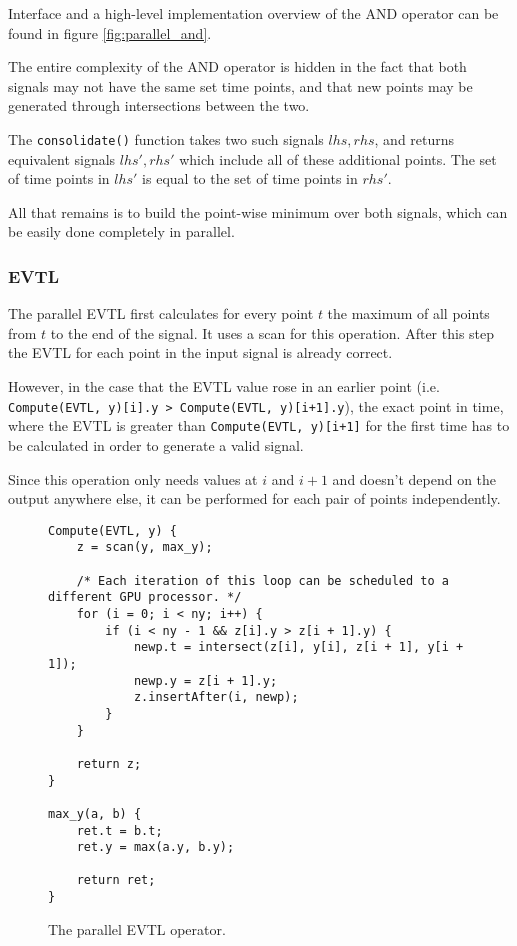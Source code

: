 \documentclass[a4paper,10pt]{article}
\begin{document}
Interface and a high-level implementation overview of the AND operator can be found 
in figure \ref{fig:parallel_and}.

The entire complexity of the AND operator is hidden in the fact that
both signals may not have the same set time points, and that new points
may be generated through intersections between the two.

The \lstinline|consolidate()|
function takes two such signals $lhs, rhs$, and returns equivalent signals $lhs', rhs'$ which include
all of these additional points. The set of time points in $lhs'$ is equal to the set
of time points in $rhs'$.

All that remains is to build the point-wise minimum over both signals, which
can be easily done completely in parallel.

\subsubsection{EVTL}

The parallel EVTL first calculates for every point $t$ the maximum of all points from
$t$ to the end of the signal. It uses a scan for this operation. After this step the
EVTL for each point in the input signal is already correct.

However, in the case that the EVTL value rose in an earlier point (i.e.
\lstinline|Compute(EVTL, y)[i].y > Compute(EVTL, y)[i+1].y|), the exact point in time,
where the EVTL is greater than \lstinline|Compute(EVTL, y)[i+1]| for the first time
has to be calculated in order to generate a valid signal.

Since this operation only needs values at $i$ and $i + 1$ and doesn't depend on the
output anywhere else, it can be performed for each pair of points independently.

\begin{figure}[H]
\begin{lstlisting}
Compute(EVTL, y) {
    z = scan(y, max_y);

    /* Each iteration of this loop can be scheduled to a different GPU processor. */
    for (i = 0; i < ny; i++) {
        if (i < ny - 1 && z[i].y > z[i + 1].y) {
            newp.t = intersect(z[i], y[i], z[i + 1], y[i + 1]);
            newp.y = z[i + 1].y;
            z.insertAfter(i, newp);
        }
    }

    return z;
}

max_y(a, b) {
    ret.t = b.t;
    ret.y = max(a.y, b.y);

    return ret;
}
\end{lstlisting}
\label{fig:par_evtl}
\caption{The parallel EVTL operator.}
\end{figure}
\end{document}
